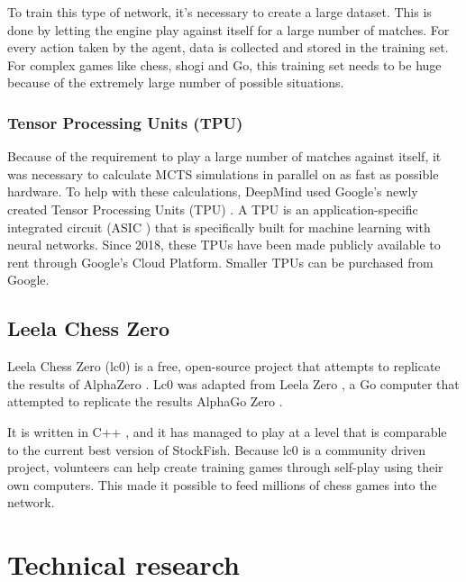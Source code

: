 \documentclass{article}
\begin{document}
To train this type of network, it's necessary to create a large dataset. 
This is done by letting the engine play against itself for a large number of matches. 
For every action taken by the agent, data is collected and stored in the training set.
For complex games like chess, shogi and Go, this training set needs to be huge
because of the extremely large number of possible situations.

\subsubsection{Tensor Processing Units (TPU)}

Because of the requirement to play a large number of matches against itself, it was necessary to calculate
MCTS simulations in parallel on as fast as possible hardware. 
To help with these calculations, DeepMind used Google's newly created Tensor Processing Units (TPU) \cite{TensorProcessingUnit2022}.
A TPU is an application-specific integrated circuit (ASIC \cite{ApplicationspecificIntegratedCircuit2022}) that is specifically built for machine learning with
neural networks. Since 2018, these TPUs have been made publicly available to rent through Google's Cloud Platform. Smaller TPUs 
can be purchased from Google. 

\subsection{Leela Chess Zero}

Leela Chess Zero (lc0) is a free, open-source project that attempts to replicate the results of AlphaZero \cite{LeelaChessZero2022}. 
Lc0 was adapted from Leela Zero \cite{LeelaZero2021}, a Go computer that attempted to replicate the results AlphaGo Zero \cite{AlphaGoZero2022}. 

It is written in C++ \cite{Lc02022}, and it has managed to play at a level that is comparable to the current best version of StockFish.
Because lc0 is a community driven project, volunteers can help create training games through self-play using their own computers.
This made it possible to feed millions of chess games into the network. 

\newpage
\section{Technical research}

\end{document}
